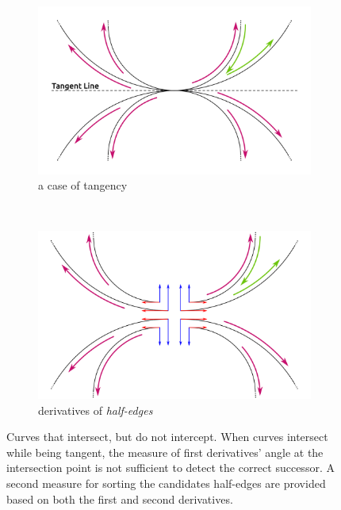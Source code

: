 \begin{figure} %
    \centering
  \begin{subfigure}{.49\textwidth}
    \includegraphics[width=\textwidth]{figures/subd_tangentCase_a.png}
    \caption{a case of tangency} \label{subfig:subd_tangentCase_a}
  \end{subfigure}%
  ~%
  \begin{subfigure}{.49\textwidth}
    \includegraphics[width=\textwidth]{figures/subd_tangentCase_b.png}
    \caption{derivatives of \emph{half-edges}} \label{subfig:subd_tangentCase_b}
  \end{subfigure}%

    \caption{Curves that intersect, but do not intercept.
      When curves intersect while being tangent, the measure of first derivatives' angle at the intersection point is not sufficient to detect the correct successor.
      A second measure for sorting the candidates half-edges are provided based on both the first and second derivatives.}
    \label{fig:subd_tangentCase}
\end{figure}


